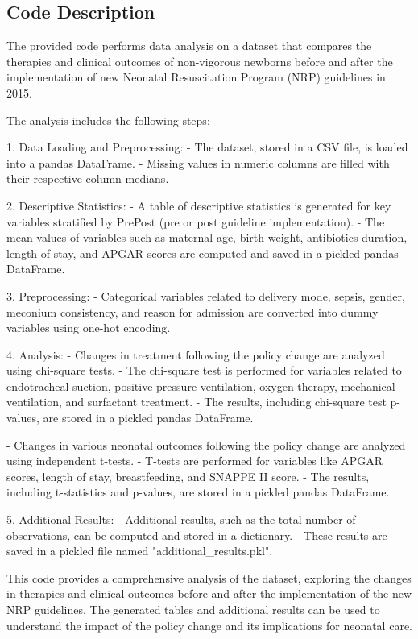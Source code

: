 \documentclass[11pt]{article}
\begin{document}
\subsection{Code Description}

The provided code performs data analysis on a dataset that compares the therapies and clinical outcomes of non-vigorous newborns before and after the implementation of new Neonatal Resuscitation Program (NRP) guidelines in 2015. 

The analysis includes the following steps:

1. Data Loading and Preprocessing:
   - The dataset, stored in a CSV file, is loaded into a pandas DataFrame.
   - Missing values in numeric columns are filled with their respective column medians.

2. Descriptive Statistics:
   - A table of descriptive statistics is generated for key variables stratified by PrePost (pre or post guideline implementation).
   - The mean values of variables such as maternal age, birth weight, antibiotics duration, length of stay, and APGAR scores are computed and saved in a pickled pandas DataFrame.

3. Preprocessing:
   - Categorical variables related to delivery mode, sepsis, gender, meconium consistency, and reason for admission are converted into dummy variables using one-hot encoding.

4. Analysis:
   - Changes in treatment following the policy change are analyzed using chi-square tests.
   - The chi-square test is performed for variables related to endotracheal suction, positive pressure ventilation, oxygen therapy, mechanical ventilation, and surfactant treatment.
   - The results, including chi-square test p-values, are stored in a pickled pandas DataFrame.
   
   - Changes in various neonatal outcomes following the policy change are analyzed using independent t-tests.
   - T-tests are performed for variables like APGAR scores, length of stay, breastfeeding, and SNAPPE II score.
   - The results, including t-statistics and p-values, are stored in a pickled pandas DataFrame.

5. Additional Results:
   - Additional results, such as the total number of observations, can be computed and stored in a dictionary.
   - These results are saved in a pickled file named "additional\_results.pkl".

This code provides a comprehensive analysis of the dataset, exploring the changes in therapies and clinical outcomes before and after the implementation of the new NRP guidelines. The generated tables and additional results can be used to understand the impact of the policy change and its implications for neonatal care.
\end{document}
